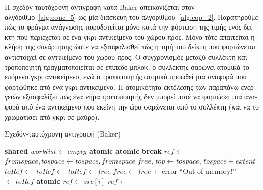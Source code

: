 \begin{greek}
Η σχεδόν ταυτόχρονη αντιγραφή κατά Baker απεικονίζεται στον
αλγόριθμο~\ref{alg:conc_5} ως μία διασκευή του αλγορίθμου~\ref{alg:cop_2}.
Παρατηρούμε πώς το φράγμα ανάγνωσης πυροδοτείται μόνο κατά
την φόρτωση της τιμής ενός δείκτη που περιέχεται σε ένα γκρι
αντικείμενο του χώρου-προς. Μόνο τότε απαιτείται η κλήση
της συνάρτησης  ώστε να εξασφαλισθεί πώς
η τιμή του δείκτη που φορτώνεται αντιστοιχεί σε αντικείμενο
του χώρου-προς. Ο συγχρονισμός μεταξύ συλλέκτη και τροποποιητή
πραγματοποιείται σε επίπεδο μπλοκ: ο συλλέκτης σαρώνει ατομικά
το επόμενο γκρι αντικείμενο, ενώ ο τροποποιητής ατομικά
προωθεί μια αναφορά που φορτώθηκε από ένα γκρι αντικείμενο.
Η ατομικότητα εκτέλεσης των παραπάνω ενεργειών εξασφαλίζει
πώς ένα νήμα τροποποιητής δεν μπορεί ποτέ να φορτώσει
μια αναφορά από ένα αντικείμενο που εκείνη την ώρα σαρώνεται
από το συλλέκτη (και να το χρωματίσει από γκρι σε μαύρο).

\begin{algorithm}
  \caption{Σχεδόν-ταυτόχρονη αντιγραφή (Baker)}
  \label{alg:conc_5}
  \begin{algorithmic}[1]
    \State \textbf{shared} $worklist \gets empty$
      \State \textbf{atomic}
      \State {}
      \EndFor
      \Loop
        \State \textbf{atomic}
          \State \textbf{break}
        \EndIf
        \State $ref \gets$ 
        \State {}
      \EndLoop
    \EndProcedure
    \Statex
      \State $fromspace, tospace \gets tospace, fromspace$
      \State $free, \, top \gets tospace, \, tospace + extent$
    \EndProcedure
    \Statex
        \State {}
      \EndFor
    \EndProcedure
    \Statex
      \State $toRef \gets$ 
        \State $toRef \gets$ 
      \EndIf
      \State {}
    \EndProcedure
    \Statex
      \State $toRef \gets free$
      \State $free \gets free +$ 
        \State error ``Out of memory!''
      \EndIf
      \State {}
      \State {} $\gets toRef$
      \State {}
      \State {}
    \EndFunction
    \Statex
      \State \textbf{atomic}
      \State $ref \gets src[i]$
        \State $ref \gets$ 
      \EndIf
      \State {}
    \EndFunction
  \end{algorithmic}
\end{algorithm}


\end{greek}
